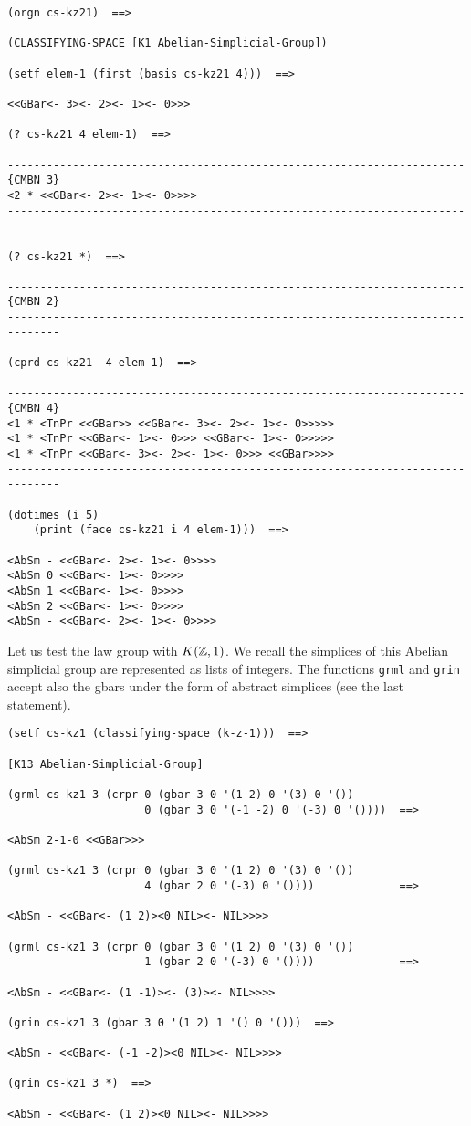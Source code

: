 \newpage
{\footnotesize\begin{verbatim}
(orgn cs-kz21)  ==>

(CLASSIFYING-SPACE [K1 Abelian-Simplicial-Group])

(setf elem-1 (first (basis cs-kz21 4)))  ==>

<<GBar<- 3><- 2><- 1><- 0>>>

(? cs-kz21 4 elem-1)  ==>

----------------------------------------------------------------------{CMBN 3}
<2 * <<GBar<- 2><- 1><- 0>>>>
------------------------------------------------------------------------------

(? cs-kz21 *)  ==>

----------------------------------------------------------------------{CMBN 2}
------------------------------------------------------------------------------

(cprd cs-kz21  4 elem-1)  ==>

----------------------------------------------------------------------{CMBN 4}
<1 * <TnPr <<GBar>> <<GBar<- 3><- 2><- 1><- 0>>>>>
<1 * <TnPr <<GBar<- 1><- 0>>> <<GBar<- 1><- 0>>>>>
<1 * <TnPr <<GBar<- 3><- 2><- 1><- 0>>> <<GBar>>>>
------------------------------------------------------------------------------

(dotimes (i 5)
    (print (face cs-kz21 i 4 elem-1)))  ==>

<AbSm - <<GBar<- 2><- 1><- 0>>>>
<AbSm 0 <<GBar<- 1><- 0>>>>
<AbSm 1 <<GBar<- 1><- 0>>>>
<AbSm 2 <<GBar<- 1><- 0>>>>
<AbSm - <<GBar<- 2><- 1><- 0>>>>
\end{verbatim}}
Let us test the law group with $K({\mathbb{Z}}, 1)$. We recall the simplices
of  this Abelian simplicial group are represented as lists of integers.
The functions {\tt grml} and {\tt grin} accept also the gbars under the form
of abstract simplices (see the last statement).
{\footnotesize\begin{verbatim}
(setf cs-kz1 (classifying-space (k-z-1)))  ==>

[K13 Abelian-Simplicial-Group]

(grml cs-kz1 3 (crpr 0 (gbar 3 0 '(1 2) 0 '(3) 0 '())
                     0 (gbar 3 0 '(-1 -2) 0 '(-3) 0 '())))  ==>

<AbSm 2-1-0 <<GBar>>>

(grml cs-kz1 3 (crpr 0 (gbar 3 0 '(1 2) 0 '(3) 0 '())
                     4 (gbar 2 0 '(-3) 0 '())))             ==>

<AbSm - <<GBar<- (1 2)><0 NIL><- NIL>>>>

(grml cs-kz1 3 (crpr 0 (gbar 3 0 '(1 2) 0 '(3) 0 '())
                     1 (gbar 2 0 '(-3) 0 '())))             ==>

<AbSm - <<GBar<- (1 -1)><- (3)><- NIL>>>>

(grin cs-kz1 3 (gbar 3 0 '(1 2) 1 '() 0 '()))  ==>

<AbSm - <<GBar<- (-1 -2)><0 NIL><- NIL>>>>

(grin cs-kz1 3 *)  ==>

<AbSm - <<GBar<- (1 2)><0 NIL><- NIL>>>>
\end{verbatim}}
